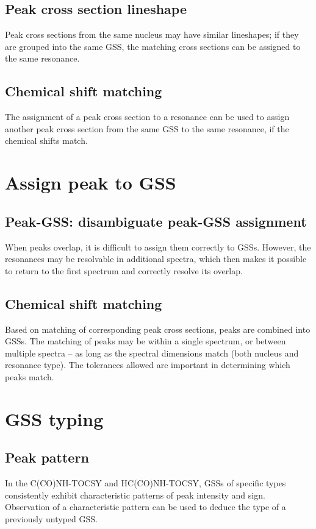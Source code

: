 \subsection*{Peak cross section lineshape}
Peak cross sections from the same nucleus may have similar lineshapes;
if they are grouped into the same GSS, the matching cross sections can be
assigned to the same resonance.

\subsection*{Chemical shift matching}
The assignment of a peak cross section to a resonance can be used to assign 
another peak cross section from the same GSS to the same resonance, if the 
chemical shifts match.



\section*{Assign peak to GSS}

\subsection*{Peak-GSS: disambiguate peak-GSS assignment}
When peaks overlap, it is difficult to assign them correctly to GSSs.  However,
the resonances may be resolvable in additional spectra, which then makes it
possible to return to the first spectrum and correctly resolve its overlap.

\subsection*{Chemical shift matching}
Based on matching of corresponding peak cross sections, peaks are combined into
GSSs.  The matching of peaks may be within a single spectrum, or between 
multiple spectra -- as long as the spectral dimensions match (both nucleus
and resonance type).  The tolerances allowed are important in determining which
peaks match.



\section*{GSS typing}

\subsection*{Peak pattern}
In the C(CO)NH-TOCSY and HC(CO)NH-TOCSY, GSSs of specific types consistently
exhibit characteristic patterns of peak intensity and sign.  Observation of
a characteristic pattern can be used to deduce the type of a previously
untyped GSS.

